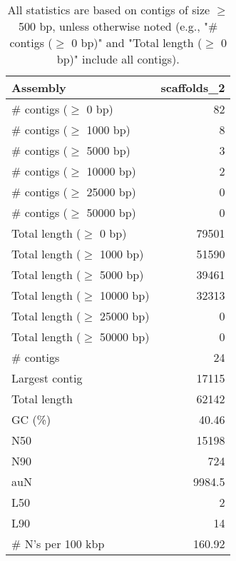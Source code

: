 \documentclass[12pt,a4paper]{article}
\begin{document}
\begin{table}[ht]
\begin{center}
\caption{All statistics are based on contigs of size $\geq$ 500 bp, unless otherwise noted (e.g., "\# contigs ($\geq$ 0 bp)" and "Total length ($\geq$ 0 bp)" include all contigs).}
\begin{tabular}{|l*{1}{|r}|}
\hline
Assembly & scaffolds\_2 \\ \hline
\# contigs ($\geq$ 0 bp) & 82 \\ \hline
\# contigs ($\geq$ 1000 bp) & 8 \\ \hline
\# contigs ($\geq$ 5000 bp) & 3 \\ \hline
\# contigs ($\geq$ 10000 bp) & 2 \\ \hline
\# contigs ($\geq$ 25000 bp) & 0 \\ \hline
\# contigs ($\geq$ 50000 bp) & 0 \\ \hline
Total length ($\geq$ 0 bp) & 79501 \\ \hline
Total length ($\geq$ 1000 bp) & 51590 \\ \hline
Total length ($\geq$ 5000 bp) & 39461 \\ \hline
Total length ($\geq$ 10000 bp) & 32313 \\ \hline
Total length ($\geq$ 25000 bp) & 0 \\ \hline
Total length ($\geq$ 50000 bp) & 0 \\ \hline
\# contigs & 24 \\ \hline
Largest contig & 17115 \\ \hline
Total length & 62142 \\ \hline
GC (\%) & 40.46 \\ \hline
N50 & 15198 \\ \hline
N90 & 724 \\ \hline
auN & 9984.5 \\ \hline
L50 & 2 \\ \hline
L90 & 14 \\ \hline
\# N's per 100 kbp & 160.92 \\ \hline
\end{tabular}
\end{center}
\end{table}
\end{document}
